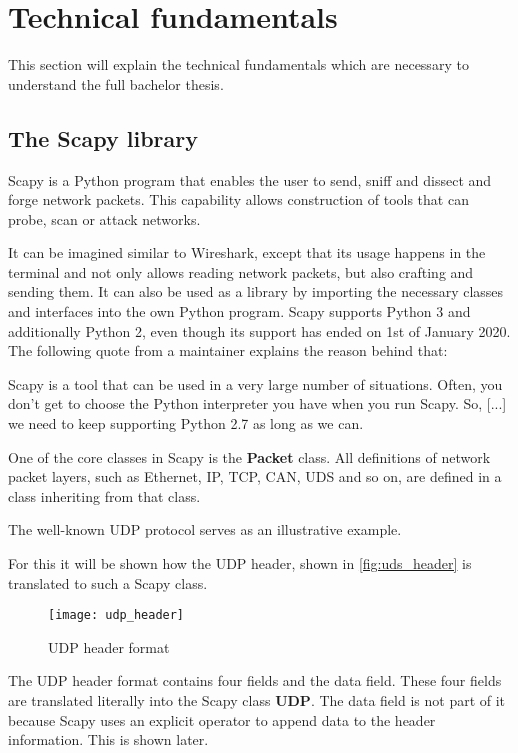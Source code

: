 \section{Technical fundamentals}

This section will explain the technical fundamentals which are necessary to understand the full bachelor thesis.

\subsection{The Scapy library}

Scapy \cite{scapy} is a Python program that enables the user to send, sniff and dissect and forge network packets. This capability allows construction of tools that can probe, scan or attack networks.

It can be imagined similar to Wireshark, except that its usage happens in the terminal and not only allows reading network packets, but also crafting and sending them. It can also be used as a library by importing the necessary classes and interfaces into the own Python program. Scapy supports Python 3 and additionally Python 2, even though its support has ended on 1st of January 2020. The following quote from a maintainer explains the reason behind that:

\begin{displayquote}
    Scapy is a tool that can be used in a very large number of situations. Often, you don't get to choose the Python interpreter you have when you run Scapy. So, [...] we need to keep supporting Python 2.7 as long as we can.
\end{displayquote}

One of the core classes in Scapy is the \textbf{Packet} class. All definitions of network packet layers, such as Ethernet, IP, TCP, CAN, UDS and so on, are defined in a class inheriting from that class.

The well-known UDP protocol \cite{udp} serves as an illustrative example.

For this it will be shown how the UDP header, shown in \autoref{fig:uds_header} is translated to such a Scapy class.

\begin{figure}[h]
    \centering
    \texttt{[image: udp\_header]}
    \caption{UDP header format \cite{udp_header}}
    \label{fig:uds_header}
\end{figure}

The UDP header format contains four fields and the data field. These four fields are translated literally into the Scapy class \textbf{UDP}. The data field is not part of it because Scapy uses an explicit operator to append data to the header information. This is shown later.

